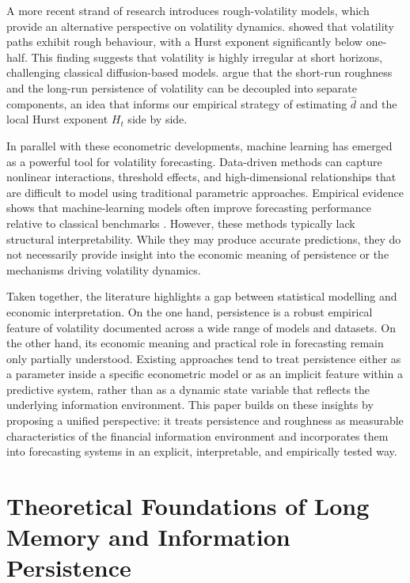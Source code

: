 \documentclass[11pt,a4paper]{article}
\newcommand{\dhat}{\hat d}
\begin{document}
A more recent strand of research introduces rough-volatility models, which
provide an alternative perspective on volatility dynamics.
\citet{gatheral2018volatility} showed that volatility paths exhibit rough
behaviour, with a Hurst exponent significantly below one-half. This
finding suggests that volatility is highly irregular at short horizons,
challenging classical diffusion-based models. \citet{bennedsen2021decoupling}
argue that the short-run roughness and the long-run persistence of
volatility can be decoupled into separate components, an idea that
informs our empirical strategy of estimating $\dhat$ and the local Hurst
exponent $H_t$ side by side.

In parallel with these econometric developments, machine learning has
emerged as a powerful tool for volatility forecasting. Data-driven methods
can capture nonlinear interactions, threshold effects, and high-dimensional
relationships that are difficult to model using traditional parametric
approaches. Empirical evidence shows that machine-learning models often
improve forecasting performance relative to classical benchmarks
\citep{gu2020empirical,breiman2001random,friedman2001greedy,hastie2009elements}.
However, these methods typically lack structural interpretability. While
they may produce accurate predictions, they do not necessarily provide
insight into the economic meaning of persistence or the mechanisms driving
volatility dynamics.

Taken together, the literature highlights a gap between statistical
modelling and economic interpretation. On the one hand, persistence is a
robust empirical feature of volatility documented across a wide range of
models and datasets. On the other hand, its economic meaning and practical
role in forecasting remain only partially understood. Existing approaches
tend to treat persistence either as a parameter inside a specific
econometric model or as an implicit feature within a predictive system,
rather than as a dynamic state variable that reflects the underlying
information environment. This paper builds on these insights by proposing
a unified perspective: it treats persistence and roughness as measurable
characteristics of the financial information environment and incorporates
them into forecasting systems in an explicit, interpretable, and
empirically tested way.

\section{Theoretical Foundations of Long Memory and Information
Persistence}
\label{sec:theory}
\end{document}
